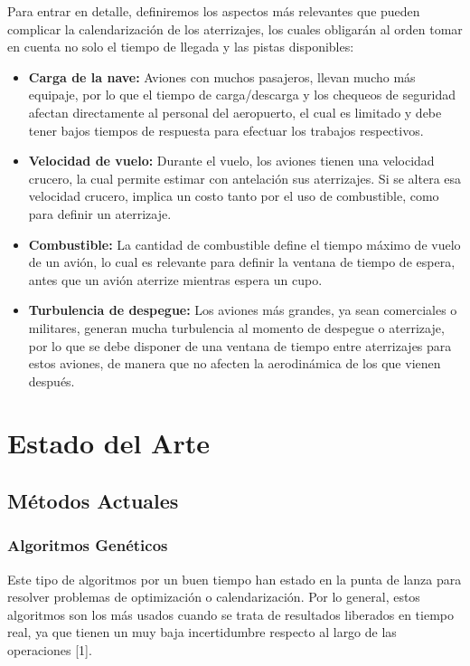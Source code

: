 \documentclass[letter, 11pt]{article}
\begin{document}
Para entrar en detalle, definiremos los aspectos más relevantes que pueden complicar la calendarización de los aterrizajes, los cuales obligarán al orden tomar en cuenta no solo el tiempo de llegada y las pistas disponibles:

\begin{itemize}
\item \textbf{Carga de la nave:} Aviones con muchos pasajeros, llevan mucho más equipaje, por lo que el tiempo de carga/descarga y los chequeos de seguridad afectan directamente al personal del aeropuerto, el cual es limitado y debe tener bajos tiempos de respuesta para efectuar los trabajos respectivos.

\item \textbf{Velocidad de vuelo:} Durante el vuelo, los aviones tienen una velocidad crucero, la cual permite estimar con antelación sus aterrizajes. Si se altera esa velocidad crucero, implica un costo tanto por el uso de combustible, como para definir un aterrizaje.

\item \textbf{Combustible:} La cantidad de combustible define el tiempo máximo de vuelo de un avión, lo cual es relevante para definir la ventana de tiempo de espera, antes que un avión aterrize mientras espera un cupo.

\item \textbf{Turbulencia de despegue:} Los aviones más grandes, ya sean comerciales o militares, generan mucha turbulencia al momento de despegue o aterrizaje, por lo que se debe disponer de una ventana de tiempo entre aterrizajes para estos aviones, de manera que no afecten la aerodinámica de los que vienen después.
\end{itemize}

\section{Estado del Arte}


\subsection{Métodos Actuales}

\subsubsection{Algoritmos Genéticos}
Este tipo de algoritmos por un buen tiempo han estado en la punta de lanza para resolver problemas de optimización o calendarización. Por lo general, estos algoritmos son los más usados cuando se trata de resultados liberados en tiempo real, ya que tienen un muy baja incertidumbre respecto al largo de las operaciones [1].
\end{document}
